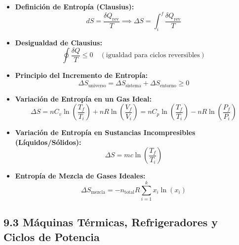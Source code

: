 \documentclass[11pt,a4paper]{article}
\begin{document}
\begin{itemize}
  \item \textbf{Definición de Entropía (Clausius):}
  \[
    dS = \frac{\delta Q_{\mathrm{rev}}}{T} \implies \Delta S = \int_i^f \frac{\delta Q_{\mathrm{rev}}}{T}
  \]
  \item \textbf{Desigualdad de Clausius:}
  \[
    \oint \frac{\delta Q}{T} \le 0 \quad (\text{igualdad para ciclos reversibles})
  \]
  \item \textbf{Principio del Incremento de Entropía:}
  \[
    \Delta S_{\text{universo}} = \Delta S_{\text{sistema}} + \Delta S_{\text{entorno}} \ge 0
  \]
  \item \textbf{Variación de Entropía en un Gas Ideal:}
  \[
    \Delta S = n C_v \ln\left( \frac{T_f}{T_i} \right) + n R \ln\left( \frac{V_f}{V_i} \right) = n C_p \ln\left( \frac{T_f}{T_i} \right) - n R \ln\left( \frac{P_f}{P_i} \right)
  \]
  \item \textbf{Variación de Entropía en Sustancias Incompresibles (Líquidos/Sólidos):}
  \[
    \Delta S = m c \ln\left( \frac{T_f}{T_i} \right)
  \]
  \item \textbf{Entropía de Mezcla de Gases Ideales:}
  \[
    \Delta S_{\text{mezcla}} = -n_{\text{total}} R \sum_{i=1}^k x_i \ln(x_i)
  \]
\end{itemize}

\subsection*{9.3 Máquinas Térmicas, Refrigeradores y Ciclos de Potencia}
\end{document}
